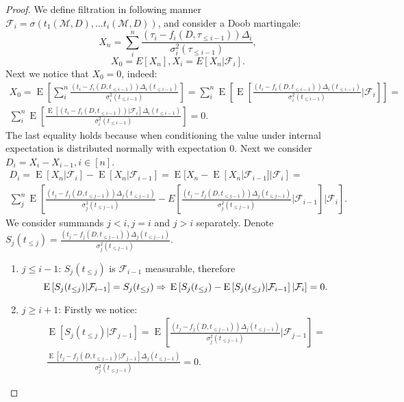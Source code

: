 \documentclass[12pt,letterpaper]{article}
\newcommand{\E}{\operatorname{E}}
\begin{document}
\begin{proof}
We define filtration in following manner $\mathcal{F}_i = \sigma(t_1(\mathcal{M}, D), \ldots t_i(\mathcal{M}, D))$, and consider a Doob martingale:
$$X_n = \sum_{i}^n\frac{(\tau_i - f_i(D, \tau_{\leq i - 1}))\Delta_i}{\sigma^2_i(\tau_{\leq i - 1})},$$
$$X_0 = E[X_n], X_i = E[X_n | \mathcal{F}_{i}].$$
Next we notice that $X_0 = 0$, indeed:
\begin{multline*}X_0 = \E\left[\sum_{i}^n\frac{(t_i - f_i(D, t_{\leq i - 1}))\Delta_i(t_{\leq i - 1})}{\sigma^2_i(t_{\leq i - 1})}\right] = \sum_{i}^n\E\left[\E\left[\frac{(t_i - f_i(D, t_{\leq i - 1}))\Delta_i(t_{\leq i - 1})}{\sigma^2_i(t_{\leq i - 1})}|\mathcal{F}_i\right]\right] = \\
  \sum_{i}^n\E\left[\frac{\E\left[(t_i - f_i(D, t_{\leq i - 1}))|\mathcal{F}_i\right]\Delta_i(t_{\leq i - 1})}{\sigma^2_i(t_{\leq i - 1})}\right] = 0.
\end{multline*}
The last equality holds because when conditioning the value under internal expectation is distributed normally with expectation $0$.
Next we consider $D_i = X_i - X_{i - 1}, i \in [n]$.
\begin{multline*}
  D_i = \E[X_n|\mathcal{F}_i] - \E[X_n|\mathcal{F}_{i-1}] = \E[X_n - \E[X_n|\mathcal{F}_{i-1}] |\mathcal{F}_i] = \\
  \sum_{j}^{n}\E\left[\frac{(t_j - f_j(D, t_{\leq j-1}))\Delta_j(t_{\leq j - 1})}{\sigma_{j}^2(t_{\leq j-1})} - E\left[\frac{(t_j - f_j(D, t_{\leq j-1}))\Delta_j(t_{\leq j - 1})}{\sigma_{j}^2(t_{\leq j-1})}|\mathcal{F}_{i-1}\right]| \mathcal{F}_{i}\right].
\end{multline*}
We consider summands $j < i, j = i$ and $j > i$ separately. Denote $S_j(t_{\leq j}) = \frac{(t_j - f_j(D, t_{\leq j-1}))\Delta_j(t_{\leq j - 1})}{\sigma_{j}^2(t_{\leq j-1})}.$
\begin{enumerate}
\item $j \leq i - 1$: $S_{j}(t_{\leq j})$ is $\mathcal{F}_{i - 1}$ measurable, therefore
\[
  \E\left[S_{j}(t_{\leq j})|\mathcal{F}_{i-1}\right] = S_j(t_{\leq j}) \Rightarrow\\ \E\left[S_j(t_{\leq j}) - \E\left[S_j(t_{\leq j})| \mathcal{F}_{i-1}\right]| \mathcal{F}_{i}\right] = 0.
\]
\item $j \geq i + 1$: Firstly we notice:
 \begin{multline*}
 \E[S_j(t_{\leq j})| \mathcal{F}_{j - 1}] = \E\left[\frac{(t_j - f_j(D, t_{\leq j-1}))\Delta_j(t_{\leq j - 1})}{\sigma_{j}^2(t_{\leq j-1})}|\mathcal{F}_{j-1}\right] = \\
 \frac{\E\left[t_j - f_j(D, t_{\leq j-1})|\mathcal{F}_{j-1}\right]\Delta_j(t_{\leq j - 1})}{\sigma_{j}^2(t_{\leq j-1})} = 0.

\end{multline*}
\end{enumerate}
\end{proof}
\end{document}
